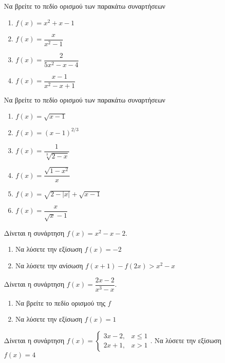 \documentclass{../../presentation}
\begin{document}
\begin{askisi}
  Να βρείτε το πεδίο ορισμού των παρακάτω συναρτήσεων
  \begin{enumerate}[<+->]
    \item $f(x)=x^2+x-1$
    \item $f(x)=\dfrac{x}{x^2-1}$
    \item $f(x)=\dfrac{2}{5x^2-x-4}$
    \item $f(x)=\dfrac{x-1}{x^2-x+1}$
  \end{enumerate}
\end{askisi}

\begin{askisi}
  Να βρείτε το πεδίο ορισμού των παρακάτω συναρτήσεων
  \begin{enumerate}[<+->]
    \item $f(x)=\sqrt{x-1}$
    \item $f(x)=(x-1)^{2/3}$
    \item $f(x)=\dfrac{1}{\sqrt[3]{2-x}}$
    \item $f(x)=\dfrac{\sqrt{1-x^2}}{x}$
    \item $f(x)=\sqrt{2-|x|}+\sqrt{x-1}$
    \item $f(x)=\dfrac{x}{\sqrt{x}-1}$
  \end{enumerate}
\end{askisi}

\begin{askisi}
  Δίνεται η συνάρτηση $f(x)=x^2-x-2$.
  \begin{enumerate}[<+->]
    \item Να λύσετε την εξίσωση $f(x)=-2$
    \item Να λύσετε την ανίσωση $f(x+1)-f(2x)>x^2-x$
  \end{enumerate}
\end{askisi}

\begin{askisi}
  Δίνεται η συνάρτηση $f(x)=\dfrac{2x-2}{x^3-x}$.
  \begin{enumerate}[<+->]
    \item Να βρείτε το πεδίο ορισμού της $f$
    \item Να λύσετε την εξίσωση $f(x)=1$
  \end{enumerate}
\end{askisi}

\begin{askisi}
  Δίνεται η συνάρτηση $f(x)=\begin{cases}
      3x-2, & x\le 1 \\
      2x+1, & x>1
    \end{cases}$. Να λύσετε την εξίσωση $f(x)=4$
\end{askisi}
\end{document}
